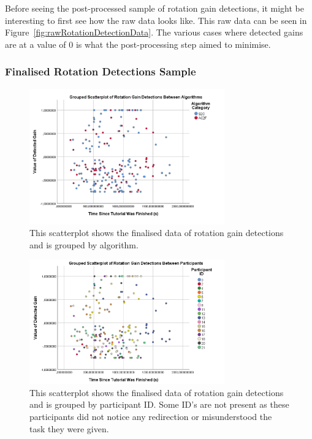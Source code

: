 Before seeing the post-processed sample of rotation gain detections, it might be interesting to first see how the raw data looks like. This raw data can be seen in Figure~\ref{fig:rawRotationDetectionData}. The various cases where detected gains are at a value of 0 is what the post-processing step aimed to minimise. 

\subsubsection{Finalised Rotation Detections Sample}
\begin{figure}[tbph]
    \centering
    \includegraphics[width=0.75\textwidth]{figures/graphs/ProcessedRotationDetections.png}
    \caption[Finalised Detection Scatterplot For Rotation Gains, Grouped by Algorithm]{This scatterplot shows the finalised data of rotation gain detections and is grouped by algorithm.}
    \label{fig:rotationDetectionDataByAlgorithm}
\end{figure}

\begin{figure}[tbph]
    \centering
    \includegraphics[width=0.75\textwidth]{figures/graphs/ProcessedRotationDetectionsByParticipant.png}
    \caption[Finalised Detection Scatterplot For Rotation Gains, Grouped by Participant ID]{This scatterplot shows the finalised data of rotation gain detections and is grouped by participant ID. Some ID's are not present as these participants did not notice any redirection or misunderstood the task they were given.}
    \label{fig:rotationDetectionDataByParticipant}
\end{figure}

